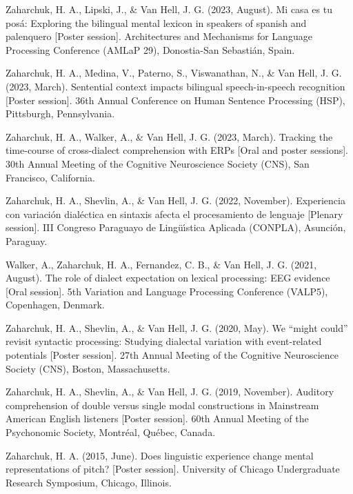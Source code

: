 \documentclass[11pt,a4paper,]{awesome-cv}
\begin{document}
\leavevmode{}%
Zaharchuk, H. A., Lipski, J., \& Van Hell, J. G. (2023, August). Mi casa
es tu posá: Exploring the bilingual mental lexicon in speakers of
spanish and palenquero {[}Poster session{]}. Architectures and
Mechanisms for Language Processing Conference (AMLaP 29), Donostia-San
Sebastián, Spain.

\leavevmode{}%
Zaharchuk, H. A., Medina, V., Paterno, S., Viswanathan, N., \& Van Hell,
J. G. (2023, March). Sentential context impacts bilingual
speech-in-speech recognition {[}Poster session{]}. 36th Annual
Conference on Human Sentence Processing (HSP), Pittsburgh, Pennsylvania.

\leavevmode{}%
Zaharchuk, H. A., Walker, A., \& Van Hell, J. G. (2023, March). Tracking
the time-course of cross-dialect comprehension with ERPs {[}Oral and
poster sessions{]}. 30th Annual Meeting of the Cognitive Neuroscience
Society (CNS), San Francisco, California.

\leavevmode{}%
Zaharchuk, H. A., Shevlin, A., \& Van Hell, J. G. (2022, November).
Experiencia con variación dialéctica en sintaxis afecta el procesamiento
de lenguaje {[}Plenary session{]}. III Congreso Paraguayo de Lingüı́stica
Aplicada (CONPLA), Asunción, Paraguay.

\leavevmode{}%
Walker, A., Zaharchuk, H. A., Fernandez, C. B., \& Van Hell, J. G.
(2021, August). The role of dialect expectation on lexical processing:
EEG evidence {[}Oral session{]}. 5th Variation and Language Processing
Conference (VALP5), Copenhagen, Denmark.

\leavevmode{}%
Zaharchuk, H. A., Shevlin, A., \& Van Hell, J. G. (2020, May). We
{``might could''} revisit syntactic processing: Studying dialectal
variation with event-related potentials {[}Poster session{]}. 27th
Annual Meeting of the Cognitive Neuroscience Society (CNS), Boston,
Massachusetts.

\leavevmode{}%
Zaharchuk, H. A., Shevlin, A., \& Van Hell, J. G. (2019, November).
Auditory comprehension of double versus single modal constructions in
Mainstream American English listeners {[}Poster session{]}. 60th Annual
Meeting of the Psychonomic Society, Montréal, Québec, Canada.

\leavevmode{}%
Zaharchuk, H. A. (2015, June). Does linguistic experience change mental
representations of pitch? {[}Poster session{]}. University of Chicago
Undergraduate Research Symposium, Chicago, Illinois.
\end{document}
